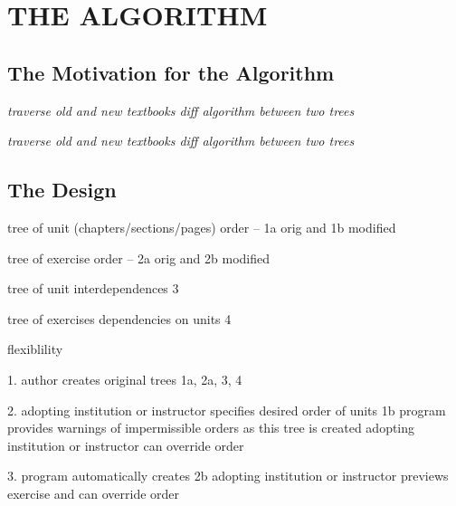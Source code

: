 %
%
%
%


\chapter{THE ALGORITHM}

\section{The Motivation for the Algorithm}

\textit{traverse old and new textbooks
diff algorithm between two trees}


\textit{traverse old and new textbooks
diff algorithm between two trees}

\cite{bile}
\cite{tsur}
\cite{react-reconcile}

\section{The Design}

tree of unit (chapters/sections/pages) order -- 1a orig and 1b modified

tree of exercise order -- 2a orig and 2b modified

tree of unit interdependences 3

tree of exercises dependencies on units 4

flexiblility 

1. author creates original trees 1a, 2a, 3, 4

2. adopting institution or instructor specifies desired order of units 1b \newline
   program provides warnings of impermissible orders as this tree is created \newline
   adopting institution or instructor can override order
   
3. program automatically creates 2b \newline
   adopting institution or instructor previews exercise and can override order
   
